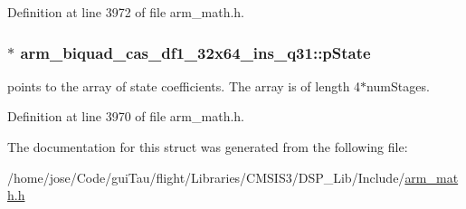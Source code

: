 Definition at line 3972 of file arm\-\_\-math.\-h.

\hypertarget{structarm__biquad__cas__df1__32x64__ins__q31_a4c899cdfaf2bb955323e93637bd662e0}{
\subsubsection[{p\-State}]{$\ast$ arm\-\_\-biquad\-\_\-cas\-\_\-df1\-\_\-32x64\-\_\-ins\-\_\-q31\-::p\-State}}\label{structarm__biquad__cas__df1__32x64__ins__q31_a4c899cdfaf2bb955323e93637bd662e0}
points to the array of state coefficients. The array is of length 4$\ast$num\-Stages. 

Definition at line 3970 of file arm\-\_\-math.\-h.



The documentation for this struct was generated from the following file\-:\begin{DoxyCompactItemize}
\item 
/home/jose/\-Code/gui\-Tau/flight/\-Libraries/\-C\-M\-S\-I\-S3/\-D\-S\-P\-\_\-\-Lib/\-Include/\hyperlink{arm__math_8h}{arm\-\_\-math.\-h}\end{DoxyCompactItemize}
